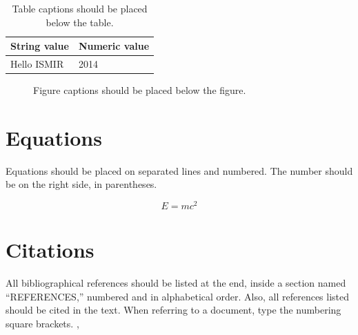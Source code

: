 \documentclass{article}
\begin{document}
\begin{table}
 \begin{center}
 \begin{tabular}{|l|l|}
  \hline
  String value & Numeric value \\
  \hline
  Hello ISMIR  & 2014 \\
  \hline
 \end{tabular}
\end{center}
 \caption{Table captions should be placed below the table.}
 \label{tab:example}
\end{table}

\begin{figure}
 \centerline{}
 \caption{Figure captions should be placed below the figure.}
 \label{fig:example}
\end{figure}

\section{Equations}

Equations should be placed on separated lines and numbered.
The number should be on the right side, in parentheses.

\begin{equation}
E=mc^{2}
\end{equation}

\section{Citations}

All bibliographical references should be listed at the end,
inside a section named ``REFERENCES,'' numbered and in alphabetical order.
Also, all references listed should be cited in the text.
When referring to a document, type the numbering square brackets. \cite{Baeza-Yates1999}, \cite{Costa2008,Gouyon2011}
\end{document}
